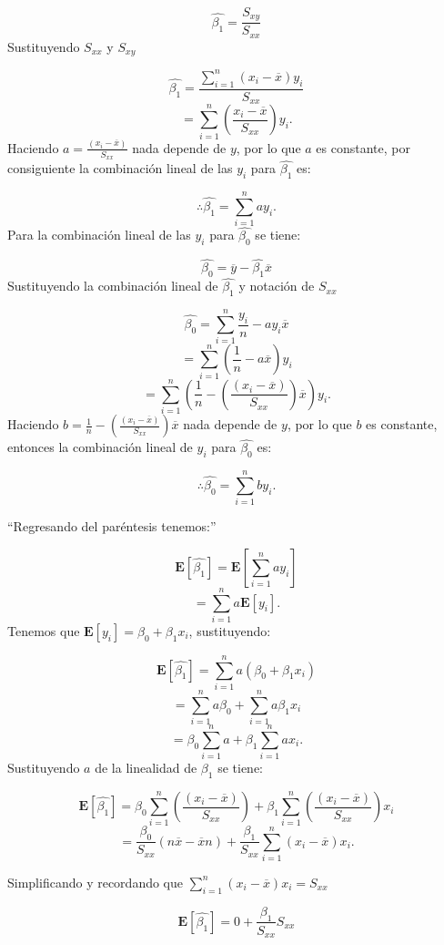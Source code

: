 \documentclass[
  a4paper,
  oneside,
  openany]{book}
\begin{document}
\[\hat{\beta_{1}}=\frac{S_{xy}}{S_{xx}}\]
Sustituyendo \(S_{xx}\) y \(S_{xy}\)

\[\hat{\beta_{1}}=\frac{\sum_{i=1}^{n}(x_{i}-\overline{x})y_{i}}{S_{xx}}\]
\[=\sum_{i=1}^{n}\left(\frac{x_{i}-\overline{x}}{S_{xx}}\right)y_{i}.\]
Haciendo \(a=\frac{(x_{i}-\overline{x})}{S_{xx}}\) nada depende de \(y\), por lo que \(a\) es constante, por consiguiente la combinación lineal de las \(y_{i}\) para \(\hat{\beta_{1}}\) es:

\[\therefore \hat{\beta_{1}}=\sum_{i=1}^{n}ay_{i}.\]
Para la combinación lineal de las \(y_{i}\) para \(\hat{\beta_{0}}\) se tiene:

\[\hat{\beta_{0}}=\overline{y}-\hat{\beta_{1}}\overline{x}\]
Sustituyendo la combinación lineal de \(\hat{\beta_{1}}\) y notación de \(S_{xx}\)

\[\hat{\beta_{0}}=\sum_{i=1}^{n}\frac{y_{i}}{n}-ay_{i}\overline{x}\]
\[=\sum_{i=1}^{n}(\frac{1}{n}-a\overline{x})y_{i}\]
\[=\sum_{i=1}^{n}\left(\frac{1}{n}-\left(\frac{(x_{i}-\overline{x})}{S_{xx}}\right)\overline{x}\right)y_{i}. \]
Haciendo \(b=\frac{1}{n}-\left(\frac{(x_{i}-\overline{x})}{S_{xx}}\right)\overline{x}\) nada depende de \(y\), por lo que \(b\) es constante, entonces la combinación lineal de \(y_{i}\) para \(\hat{\beta_{0}}\) es:

\[\therefore \hat{\beta_{0}}=\sum_{i=1}^{n}by_{i}.\]

``Regresando del paréntesis tenemos:''

\[\mathbf{E}\left[\hat{\beta_{1}}\right]=\mathbf{E}\left[\sum_{i=1}^{n}ay_{i}\right]\]
\[=\sum_{i=1}^{n}a\mathbf{E}[y_{i}].\]
Tenemos que \(\mathbf{E}[y_{i}]=\beta_{0}+\beta_{1}x_{i}\), sustituyendo:

\[\mathbf{E}\left[\hat{\beta_{1}}\right]=\sum_{i=1}^{n}a(\beta_{0}+\beta_{1}x_{i})\]
\[=\sum_{i=1}^{n}a\beta_{0}+\sum_{i=1}^{n}a\beta_{1}x_{i}\]
\[=\beta_{0}\sum_{i=1}^{n}a+\beta_{1}\sum_{i=1}^{n}ax_{i}.\]
Sustituyendo \(a\) de la linealidad de \(\beta_{1}\) se tiene:

\[\mathbf{E}\left[\hat{\beta_{1}}\right]=\beta_{0}\sum_{i=1}^{n}\left(\frac{(x_{i}-\overline{x})}{S_{xx}}\right)+\beta_{1}\sum_{i=1}^{n}\left(\frac{(x_{i}-\overline{x})}{S_{xx}}\right)x_{i}\]
\[=\frac{\beta_{0}}{S_{xx}}(n\overline{x}-\overline{x}n)+\frac{\beta_{1}}{S_{xx}}\sum_{i=1}^{n}(x_{i}-\overline{x})x_{i}.\]

Simplificando y recordando que \(\sum_{i=1}^{n}(x_{i}-\overline{x})x_{i}=S_{xx}\)

\[\mathbf{E}\left[\hat{\beta_{1}}\right]=0+\frac{\beta_{1}}{S_{xx}}S_{xx}\]
\end{document}
